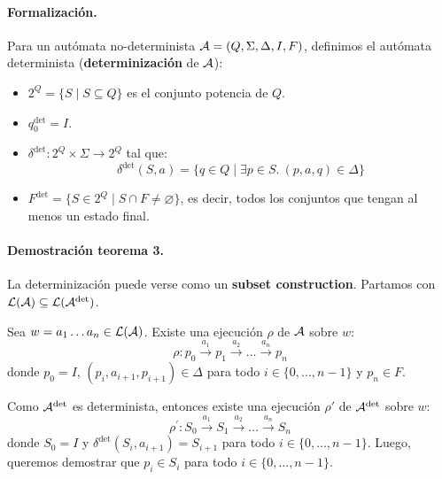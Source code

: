 \paragraph{Formalización.} Para un autómata no-determinista $\mathcal{A} = (Q,\Sigma,\Delta,I,F)$, definimos el autómata determinista (\textbf{determinización} de $\mathcal{A}$):
\begin{itemize}
    \item $2^Q = \{S \mid S\subseteq Q\}$ es el conjunto potencia de $Q$.
    \item $q_0^\text{det} = I$.
    \item $\delta^\text{det}: 2^Q \times \Sigma \to 2^Q$ tal que:
          $$
              \delta^\text{det}(S,a) = \{q \in Q \mid \exists p \in S.\ (p,a,q) \in \Delta\}
          $$
    \item $F^\text{det} = \{S \in 2^Q \mid S \cap F \neq \varnothing\}$, es decir, todos los conjuntos que tengan al menos un estado final.
\end{itemize}

\paragraph{Demostración teorema 3.} La determinización puede verse como un \textbf{subset construction}. Partamos con $\mathcal{L}(\mathcal{A}) \subseteq \mathcal{L}(\mathcal{A}^\text{det})$. \medbreak

Sea $w = a_1\ldots a_n \in \mathcal{L}(\mathcal{A})$. Existe una ejecución $\rho$ de $\mathcal{A}$ sobre $w$:
$$
    \rho: p_0 \stackrel{a_1}{\rightarrow} p_1 \stackrel{a_2}{\rightarrow} \ldots \stackrel{a_n}{\rightarrow} p_n
$$
donde $p_0 = I$, $(p_i, a_{i+1},p_{i+1}) \in \Delta$ para todo $i \in \{0,\ldots,n-1\}$ y $p_n \in F$. \medbreak

Como $\mathcal{A}^\text{det}$ es determinista, entonces existe una ejecución $\rho'$ de $\mathcal{A}^\text{det}$ sobre $w$:
$$
    \rho^{\prime}: S_0 \stackrel{a_1}{\rightarrow} S_1 \stackrel{a_2}{\rightarrow} \ldots \stackrel{a_n}{\rightarrow} S_n
$$
donde $S_0 = I$ y $\delta^\text{det}(S_i, a_{i+1}) = S_{i+1}$ para todo $i \in \{0,\ldots,n-1\}$. Luego, queremos demostrar que $p_i \in S_i$ para todo $i \in \{0,\ldots,n-1\}$. \medbreak

